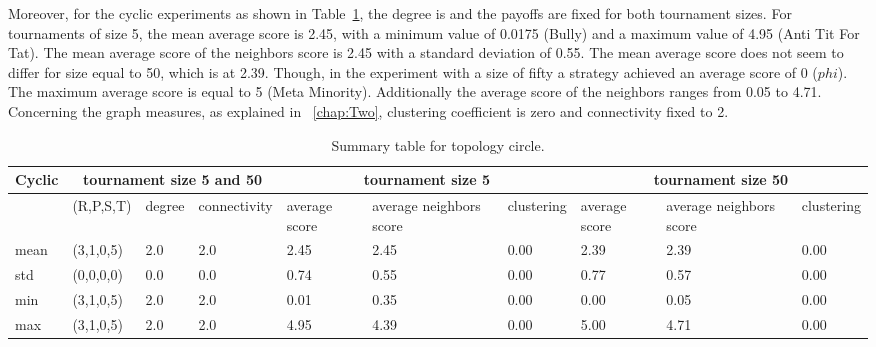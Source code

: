 Moreover, for the cyclic experiments as shown in Table~\ref{sum-cicle}, the degree is
and the payoffs are fixed for both tournament sizes. For tournaments of size 5,
the mean average score is 2.45, with a minimum value of 0.0175 (Bully) and a maximum
value of 4.95 (Anti Tit For Tat). The mean average score of the neighbors score
is 2.45 with a standard deviation of 0.55.
The mean average score does not seem to differ for size equal to 50, which is at
2.39. Though, in the experiment with a size of fifty a strategy
achieved an average score of 0 ($phi$). The maximum average score is equal to
5 (Meta Minority). Additionally the average score of the neighbors ranges
from 0.05 to 4.71. Concerning the graph measures, as explained in ~\ref{chap:Two},
clustering coefficient is zero and connectivity fixed to 2.

\begin{table}[!hbtp]
	\centering
	\begin{adjustbox}{width=1\textwidth}
		\small
		\begin{tabular}{@{}|l|l|l|l|l|l|l|l|l|l|@{}}
			\toprule
			Cyclic & \multicolumn{3}{c|}{tournament size 5 and 50} & \multicolumn{3}{c|}{tournament size 5} & \multicolumn{3}{c|}{tournament size 50}                             \\\midrule

			     & (R,P,S,T) & degree & connectivity & average score & average neighbors score & clustering & average score & average neighbors score & clustering \\\midrule
			mean & (3,1,0,5) & 2.0    & 2.0          & 2.45          & 2.45                    & 0.00       & 2.39          & 2.39                    & 0.00       \\\midrule
			std  & (0,0,0,0) & 0.0    & 0.0          & 0.74          & 0.55                    & 0.00       & 0.77          & 0.57                    & 0.00       \\\midrule
			min  & (3,1,0,5) & 2.0    & 2.0          & 0.01          & 0.35                    & 0.00       & 0.00          & 0.05                    & 0.00       \\\midrule
			max  & (3,1,0,5) & 2.0    & 2.0          & 4.95          & 4.39                    & 0.00       & 5.00          & 4.71                    & 0.00       \\ \bottomrule
		\end{tabular}
	\end{adjustbox}
	\caption{Summary table for topology circle.}
	\label{sum-cicle}
\end{table}

